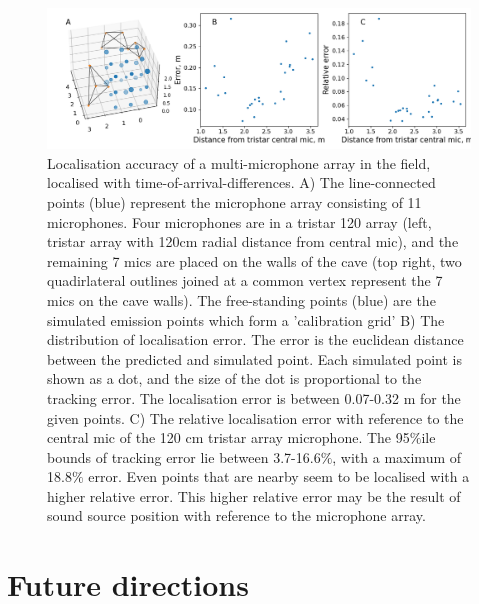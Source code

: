 \documentclass[
]{book}
\begin{document}
\begin{figure}
\includegraphics[width=1.0\columnwidth]{original_papers/tacost/data_for_figures/analysis/fig2_points_and_error.png}
\centering
\caption{Localisation accuracy of a multi-microphone array in the field, localised with time-of-arrival-differences. A) The line-connected points (blue) represent the microphone array consisting of 11 microphones. Four microphones are in a tristar 120 array (left, tristar array with 120cm radial distance from central mic), and 
the remaining 7 mics are placed on the walls of the cave (top right, two quadirlateral outlines joined at a common vertex represent the 7 mics on the cave walls). The free-standing points (blue) are  the simulated emission points which form a 'calibration grid' B) The distribution of localisation error. The error is 
the euclidean distance between the predicted and simulated point. Each simulated point is shown as a dot, and the size of the dot is proportional to the tracking error. The localisation error is between 0.07-0.32 m for the given points. C) The relative localisation error with reference to the central mic of the 120 cm tristar array microphone. The 95$\%$ile bounds of tracking error lie between 3.7-16.6$\%$, with a maximum of 18.8$\%$ error. Even points that are nearby seem to be localised with a higher relative error. This higher relative error may be the result of sound source position with reference to the microphone array.}
\label{tacostfig2}
\end{figure}

\hypertarget{future-directions}{%
\section{Future directions}\label{future-directions}}
\end{document}
